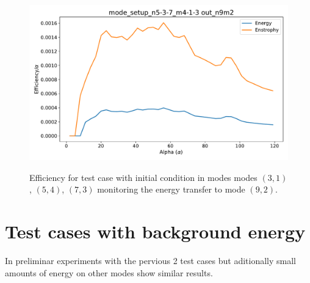 \documentclass[a4paper,10pt]{article}
\begin{document}
\begin{figure}
\centering
 \includegraphics[scale=0.4]{figs/mode_setup_n5-3-7_m4-1-3_out_n9m2.pdf}
 \label{tc2-eficiency}
 \caption{Efficiency for test case with initial condition in modes modes $(3,1)$, $(5,4)$, $(7,3)$ monitoring the energy transfer to mode $(9,2)$.}
\end{figure}

\clearpage

\section{Test cases with background energy}

In preliminar experiments with the pervious 2 test cases but aditionally small amounts of energy on other modes show similar results.
\end{document}
